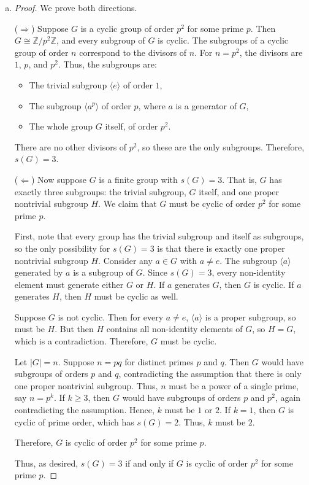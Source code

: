 \documentclass{article}
\def\zz{{\mathbb Z}}
\begin{document}
\begin{enumerate}[(a)]
\begin{proof}
        Hence, we conclude that $s(G) = 2$ if and only if $G$ is cyclic of prime order.
    \end{proof}
    \item \begin{proof}
        We prove both directions.

        ($\Rightarrow$) Suppose $G$ is a cyclic group of order $p^2$ for some prime $p$. Then $G \cong \zz/p^2\zz$, and every subgroup of $G$ is cyclic. The subgroups of a cyclic group of order $n$ correspond to the divisors of $n$. For $n = p^2$, the divisors are $1$, $p$, and $p^2$. Thus, the subgroups are:
        \begin{itemize}
            \item The trivial subgroup $\langle e \rangle$ of order $1$,
            \item The subgroup $\langle a^p \rangle$ of order $p$, where $a$ is a generator of $G$,
            \item The whole group $G$ itself, of order $p^2$.
        \end{itemize}
        There are no other divisors of $p^2$, so these are the only subgroups. Therefore, $s(G) = 3$.

        ($\Leftarrow$) Now suppose $G$ is a finite group with $s(G) = 3$. That is, $G$ has exactly three subgroups: the trivial subgroup, $G$ itself, and one proper nontrivial subgroup $H$. We claim that $G$ must be cyclic of order $p^2$ for some prime $p$.

        First, note that every group has the trivial subgroup and itself as subgroups, so the only possibility for $s(G) = 3$ is that there is exactly one proper nontrivial subgroup $H$. Consider any $a \in G$ with $a \neq e$. The subgroup $\langle a \rangle$ generated by $a$ is a subgroup of $G$. Since $s(G) = 3$, every non-identity element must generate either $G$ or $H$. If $a$ generates $G$, then $G$ is cyclic. If $a$ generates $H$, then $H$ must be cyclic as well.

        Suppose $G$ is not cyclic. Then for every $a \neq e$, $\langle a \rangle$ is a proper subgroup, so must be $H$. But then $H$ contains all non-identity elements of $G$, so $H = G$, which is a contradiction. Therefore, $G$ must be cyclic.

        Let $|G| = n$. Suppose $n = pq$ for distinct primes $p$ and $q$. Then $G$ would have subgroups of orders $p$ and $q$, contradicting the assumption that there is only one proper nontrivial subgroup. Thus, $n$ must be a power of a single prime, say $n = p^k$. If $k \geq 3$, then $G$ would have subgroups of orders $p$ and $p^2$, again contradicting the assumption. Hence, $k$ must be $1$ or $2$. If $k = 1$, then $G$ is cyclic of prime order, which has $s(G) = 2$. Thus, $k$ must be $2$.

        Therefore, $G$ is cyclic of order $p^2$ for some prime $p$.

        Thus, as desired, $s(G) = 3$ if and only if $G$ is cyclic of order $p^2$ for some prime $p$.
    \end{proof}

\end{enumerate}
\end{document}
